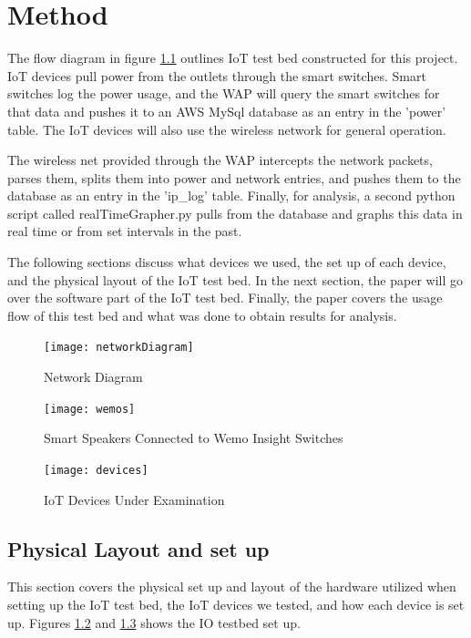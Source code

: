 \chapter{Method}
\label{Method}
The flow diagram in figure \ref{fig:network} outlines IoT test bed constructed for this project. IoT devices pull power from the outlets through the smart switches. Smart switches log the power usage, and the WAP will query the smart switches for that data and pushes it to an AWS MySql database as an entry in the 'power' table. The IoT devices will also use the wireless network for general operation.

The wireless net provided through the WAP intercepts the network packets, parses them, splits them into power and network entries, and pushes them to the database as an entry in the 'ip\_log' table. Finally, for analysis, a second python script called realTimeGrapher.py pulls from the database and graphs this data in real time or from set intervals in the past.

The following sections discuss what devices we used, the set up of each device, and the physical layout of the IoT test bed. In the next section, the paper will go over the software part of the IoT test bed. Finally, the paper covers the usage flow of this test bed and what was done to obtain results for analysis.

\begin{figure}[H]
    \centering
    \texttt{[image: networkDiagram]}
    \caption{Network Diagram}
    \label{fig:network}
\end{figure}

\begin{figure}[H]
    \centering
    \texttt{[image: wemos]}
    \caption{Smart Speakers Connected to Wemo Insight Switches}
    \label{fig:wemo}
\end{figure}

\begin{figure}[H]
    \centering
    \texttt{[image: devices]}
    \caption{IoT Devices Under Examination}
    \label{fig:devices}
\end{figure}

\section{Physical Layout and set up}
\label{Physical Layout and set up}

This section covers the physical set up and layout of the hardware utilized when setting up the IoT test bed, the IoT devices we tested, and how each device is set up. Figures \ref{fig:wemo} and \ref{fig:devices} shows the IO testbed set up.

